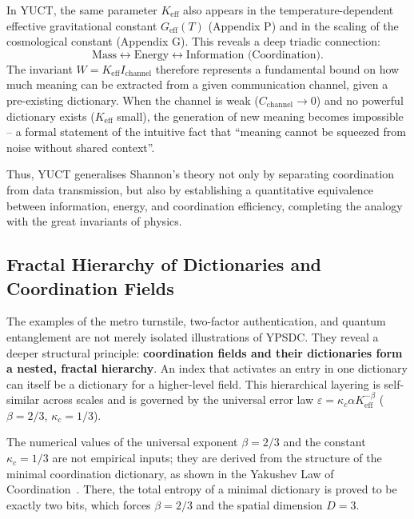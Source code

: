 \documentclass[12pt,a4paper]{article}
\theoremstyle{remark}
\begin{document}
	In YUCT, the same parameter \(K_{\mathrm{eff}}\) also appears in the temperature-dependent effective gravitational constant \(G_{\text{eff}}(T)\) (Appendix P) and in the scaling of the cosmological constant (Appendix G). This reveals a deep triadic connection:
	\[
	\text{Mass} \leftrightarrow \text{Energy} \leftrightarrow \text{Information (Coordination)}.
	\]
	The invariant \(W = K_{\mathrm{eff}} I_{\text{channel}}\) therefore represents a fundamental bound on how much meaning can be extracted from a given communication channel, given a pre-existing dictionary. When the channel is weak (\(C_{\text{channel}} \to 0\)) and no powerful dictionary exists (\(K_{\mathrm{eff}}\) small), the generation of new meaning becomes impossible -- a formal statement of the intuitive fact that ``meaning cannot be squeezed from noise without shared context''.
	
	Thus, YUCT generalises Shannon's theory not only by separating coordination from data transmission, but also by establishing a quantitative equivalence between information, energy, and coordination efficiency, completing the analogy with the great invariants of physics.
	
	
	\subsection{Fractal Hierarchy of Dictionaries and Coordination Fields}
	\label{subsec:fractal-hierarchy}
	
	The examples of the metro turnstile, two-factor authentication, and
	quantum entanglement are not merely isolated illustrations of YPSDC.
	They reveal a deeper structural principle: \textbf{coordination fields
		and their dictionaries form a nested, fractal hierarchy}.  An index
	that activates an entry in one dictionary can itself be a dictionary
	for a higher-level field.  This hierarchical layering is self-similar
	across scales and is governed by the universal error law
	$\varepsilon = \kappa_c \alpha K_{\mathrm{eff}}^{-\beta}$
	($\beta=2/3$, $\kappa_c=1/3$).
	
	The numerical values of the universal exponent \(\beta = 2/3\) and the
	constant \(\kappa_c = 1/3\) are not empirical inputs; they are derived from
	the structure of the minimal coordination dictionary, as shown in the
	Yakushev Law of Coordination~\cite{YakushevLaw2026}.  There, the total
	entropy of a minimal dictionary is proved to be exactly two bits, which
	forces \(\beta = 2/3\) and the spatial dimension \(D = 3\).
	
\end{document}
